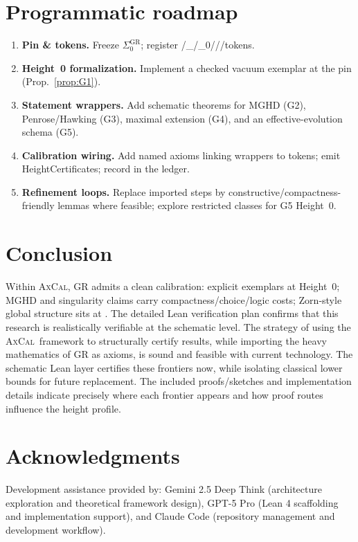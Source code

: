 \documentclass[11pt]{article}
\theoremstyle{definition}
\theoremstyle{remark}
\newcommand{\WLPO}{\mathrm{WLPO}}
\newcommand{\LEM}{\mathrm{LEM}}
\newcommand{\FT}{\mathrm{FT}}
\newcommand{\WKLz}{\mathrm{WKL}_0}
\newcommand{\AC}{\mathrm{AC}}
\newcommand{\DCw}{\mathrm{DC}_\omega}
\newcommand{\SigmaZero}{\Sigma_{0}}
\newcommand{\AxCal}{\textsc{AxCal}}
\begin{document}
\section{Programmatic roadmap}
\begin{enumerate}
\item \textbf{Pin \& tokens.} Freeze $\SigmaZero^{\mathrm{GR}}$; register \AC/\DCw/\WKLz/\FT/\LEM/\WLPO tokens.
\item \textbf{Height~0 formalization.} Implement a checked vacuum exemplar at the pin (Prop.~\ref{prop:G1}).
\item \textbf{Statement wrappers.} Add schematic theorems for MGHD (G2), Penrose/Hawking (G3), maximal extension (G4), and an effective-evolution schema (G5).
\item \textbf{Calibration wiring.} Add named axioms linking wrappers to tokens; emit HeightCertificates; record in the ledger.
\item \textbf{Refinement loops.} Replace imported steps by constructive/compactness-friendly lemmas where feasible; explore restricted classes for G5 Height~0.
\end{enumerate}

\section{Conclusion}
Within \AxCal, GR admits a clean calibration: explicit exemplars at Height~0; MGHD and singularity claims carry compactness/choice/logic costs; Zorn-style global structure sits at \AC. The detailed Lean verification plan confirms that this research is realistically verifiable at the schematic level. The strategy of using the \AxCal\ framework to structurally certify results, while importing the heavy mathematics of GR as axioms, is sound and feasible with current technology. The schematic Lean layer certifies these frontiers now, while isolating classical lower bounds for future replacement. The included proofs/sketches and implementation details indicate precisely where each frontier appears and how proof routes influence the height profile.

\section*{Acknowledgments}
Development assistance provided by: Gemini 2.5 Deep Think (architecture exploration and theoretical framework design), GPT-5 Pro (Lean 4 scaffolding and implementation support), and Claude Code (repository management and development workflow).
\end{document}
